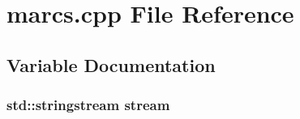 \hypertarget{a00028}{\section{marcs.\-cpp File Reference}
\label{a00028}
}


\subsection{Variable Documentation}
\hypertarget{a00028_a345cf940396976355b8d6a8248bc17dc}{
\subsubsection[{stream}]{\setlength{\rightskip}{0pt plus 5cm}std\-::stringstream stream}}\label{a00028_a345cf940396976355b8d6a8248bc17dc}

